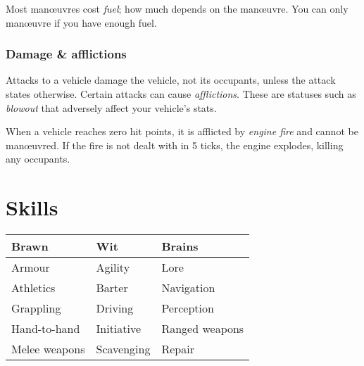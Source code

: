 \documentclass[10pt, a4paper, twocolumn]{article}
\begin{document}
Most man\oe{}uvres cost \emph{fuel}; how much depends on the man\oe{}uvre. You can only man\oe{}uvre if you have enough fuel.

\subsubsection{Damage \& afflictions}
Attacks to a vehicle damage the vehicle, not its occupants, unless the attack states otherwise. Certain attacks can cause \emph{afflictions}. These are statuses such as \emph{blowout} that adversely affect your vehicle's stats.

When a vehicle reaches zero hit points, it is afflicted by \emph{engine fire} and cannot be man\oe{}uvred. If the fire is not dealt with in 5 ticks, the engine explodes, killing any occupants.

\clearpage
\subtitle{Extended Rules}
\compacttitle

\section{Skills}
{\small\begin{tabular}{lll}
  Brawn         & Wit        & Brains         \\
  \hline
  Armour        & Agility    & Lore           \\
  Athletics     & Barter     & Navigation     \\
  Grappling     & Driving    & Perception     \\
  Hand-to-hand  & Initiative & Ranged weapons \\
  Melee weapons & Scavenging & Repair
\end{tabular}}
\end{document}
